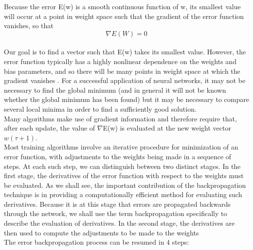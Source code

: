 \documentclass[a4paper, 10pt]{book}
\begin{document}
Because the error E(w) is a smooth continuous function of w, its smallest value will occur at a
point in weight space such that the gradient of the error function vanishes, so that
\begin{equation}
    \label{eqn:gradient E}
\nabla  E(W) = 0
\end{equation}
\\
Our goal is to find a vector such that E(w) takes its smallest value. 
However, the error function typically has a highly nonlinear dependence on the weights and bias parameters, and so there will be many points in weight space at which the gradient vanishes .
For a successful application of neural networks, it may not be necessary to find the global minimum (and in general it will not be known whether the global minimum has been found) but it may be necessary to compare several local minima in order to find a sufficiently good solution.
\\
Many algorithms make use of gradient information and therefore require that, after each update, the value of $\nabla$E(w) is evaluated at the new weight vector $w ( \tau +1 ) $. 
\\
Most training algorithms involve an iterative procedure for minimization of an error function, with adjustments to the weights being made in a sequence of steps. At each such step, we can distinguish between two distinct stages. In the first stage, the derivatives of the error function with respect to the weights must be evaluated. As we shall see, the important contribution of the backpropagation technique is in providing a computationally efficient method for evaluating such derivatives. Because it is at this stage that errors are propagated backwards through the network, we shall use the term backpropagation specifically to describe the evaluation of derivatives.
In the second stage, the derivatives are then used to compute the adjustments to be made to the weights
\\
The error  backpropagation process can be resumed in 4 steps:
\end{document}
